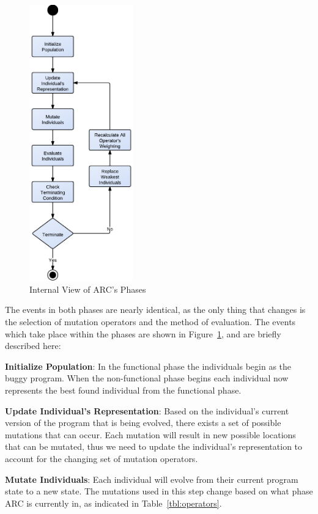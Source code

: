 \documentclass[10pt, conference, compsocconf]{IEEEtran}
\begin{document}
\begin{figure}[!h]
  \centering
  \includegraphics[width=4.50cm]{figures/phases.pdf}
  \caption{Internal View of ARC's Phases}
  \label{fig:phases_internals}
\end{figure}

The events in both phases are nearly identical, as the only thing that changes
is the selection of mutation operators and the method of evaluation. The events
which take place within the phases are shown in
Figure~\ref{fig:phases_internals}, and are briefly described here:

\textbf{Initialize Population}: In the functional phase the individuals begin
as the buggy program. When the non-functional phase begins each individual now
represents the best found individual from the functional phase.

\textbf{Update Individual's Representation}: Based on the individual's current
version of the program that is being evolved, there exists a set of possible
mutations that can occur. Each mutation will result in new possible locations
that can be mutated, thus we need to update the individual's representation to
account for the changing set of mutation operators.

\textbf{Mutate Individuals}: Each individual will evolve from their current
program state to a new state. The mutations used in this step change based on
what phase ARC is currently in, as indicated in Table~\ref{tbl:operators}.
\end{document}
